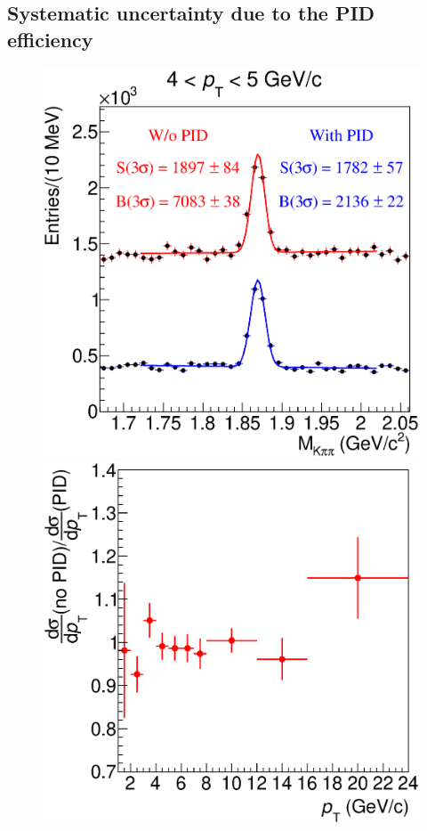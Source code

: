 \documentclass[b5paper,10pt,twoside,oldstyle,classica]{toptesi}
\begin{document}
\subsection{Systematic uncertainty due to the PID efficiency}
\begin{figure}[tb]
\begin{center}
{\includegraphics[scale = 0.31]{KFMassComp_Pt3.eps}}
\hspace{-0.5cm}
{\includegraphics[scale = 0.31]{Ratio_KF_noPID.eps}}

\end{center}
\end{figure}
\end{document}
